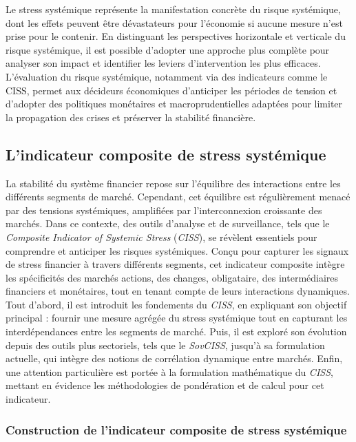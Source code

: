 Le stress systémique représente la manifestation concrète du risque systémique, dont les effets peuvent être dévastateurs pour l’économie si aucune mesure n’est prise pour le contenir. En distinguant les perspectives horizontale et verticale du risque systémique, il est possible d’adopter une approche plus complète pour analyser son impact et identifier les leviers d’intervention les plus efficaces. L’évaluation du risque systémique, notamment via des indicateurs comme le CISS, permet aux décideurs économiques d’anticiper les périodes de tension et d’adopter des politiques monétaires et macroprudentielles adaptées pour limiter la propagation des crises et préserver la stabilité financière.

\subsection{L'indicateur composite de stress systémique}

La stabilité du système financier repose sur l'équilibre des interactions entre les différents segments de marché. Cependant, cet équilibre est régulièrement menacé par des tensions systémiques, amplifiées par l'interconnexion croissante des marchés. Dans ce contexte, des outils d'analyse et de surveillance, tels que le \textit{Composite Indicator of Systemic Stress} (\textit{CISS}), se révèlent essentiels pour comprendre et anticiper les risques systémiques. Conçu pour capturer les signaux de stress financier à travers différents segments, cet indicateur composite intègre les spécificités des marchés actions, des changes, obligataire, des intermédiaires financiers et monétaires, tout en tenant compte de leurs interactions dynamiques.\\

Tout d'abord, il est introduit les fondements du \textit{CISS}, en expliquant son objectif principal : fournir une mesure agrégée du stress systémique tout en capturant les interdépendances entre les segments de marché. Puis, il est exploré son évolution depuis des outils plus sectoriels, tels que le \textit{SovCISS}, jusqu'à sa formulation actuelle, qui intègre des notions de corrélation dynamique entre marchés. Enfin, une attention particulière est portée à la formulation mathématique du \textit{CISS}, mettant en évidence les méthodologies de pondération et de calcul pour cet indicateur.

\subsubsection{Construction de l'indicateur composite de stress systémique}

